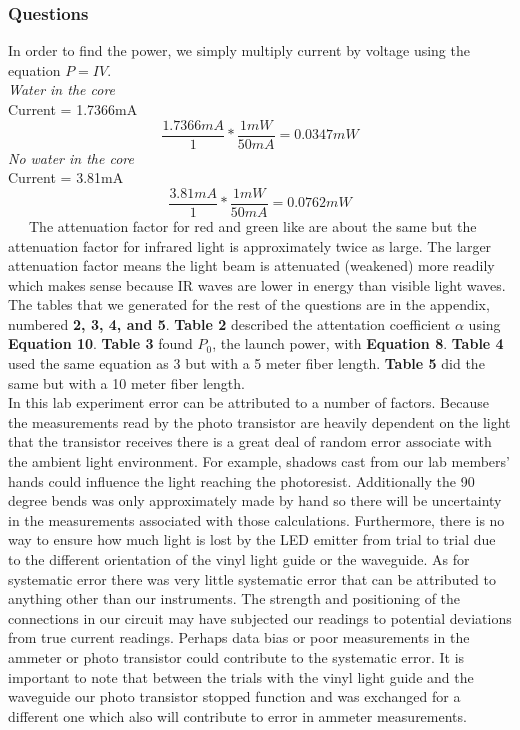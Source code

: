 \documentclass{article}
\begin{document}
\subsubsection*{Questions}
In order to find the power, we simply multiply current by voltage using the equation $P = IV$.\\
\textit{Water in the core}\\
Current = 1.7366mA
$$\frac{1.7366mA}{1} * \frac{1mW}{50mA} = 0.0347mW$$
\textit{No water in the core}\\
Current = 3.81mA
$$\frac{3.81mA}{1} * \frac{1mW}{50mA} = 0.0762mW$$
\ \ \ The attenuation factor for red and green like are about the same but the attenuation factor for infrared light is approximately twice as large. The larger attenuation factor means the light beam is attenuated (weakened) more readily which makes sense because IR waves are lower in energy than visible light waves. The tables that we generated for the rest of the questions are in the appendix, numbered \textbf{2, 3, 4, and 5}. \textbf{Table 2} described the attentation coefficient $\alpha$ using \textbf{Equation 10}. \textbf{Table 3} found $P_0$, the launch power, with \textbf{Equation 8}. \textbf{Table 4} used the same equation as 3 but with a 5 meter fiber length. \textbf{Table 5} did the same but with a 10 meter fiber length.\\

In this lab experiment error can be attributed to a number of factors. Because the measurements read by the photo transistor are heavily dependent on the light that the transistor receives there is a great deal of random error associate with the ambient light environment. For example, shadows cast from our lab members’ hands could influence the light reaching the photoresist. Additionally the 90 degree bends was only approximately made by hand so there will be uncertainty in the measurements associated with those calculations. Furthermore, there is no way to ensure how much light is lost by the LED emitter from trial to trial due to the different orientation of the vinyl light guide or the waveguide. As for systematic error there was very little systematic error that can be attributed to anything other than our instruments. The strength and positioning of the connections in our circuit may have subjected our readings to potential deviations from true current readings. Perhaps data bias or poor measurements in the ammeter or photo transistor could contribute to the systematic error. It is important to note that between the trials with the vinyl light guide and the waveguide our photo transistor stopped function and was exchanged for a different one which also will contribute to error in ammeter measurements. 
\end{document}
